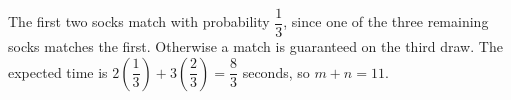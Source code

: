 The first two socks match with probability $\dfrac{1}{3}$, since one of the three remaining socks matches the first. Otherwise a match is guaranteed on the third draw. The expected time is $2(\dfrac{1}{3})+3(\dfrac{2}{3})=\dfrac{8}{3}$ seconds, so $\boxed{m+n=11}$.
